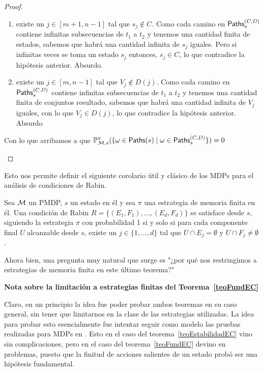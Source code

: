 \begin{proof}
\begin{itemize}
		      \begin{enumerate}
			      \item existe un $j \in [m+1, n-1]$ tal que $s_j \notin C$. Como cada camino en
			            $\textsf{Paths}_s^{(C,D)}$ contiene infinitas subsecuencias de $t_1$ a $t_2$ y tenemos
			            una cantidad finita de estados, sabemos que habrá una cantidad infinita de
			            $s_j$ iguales. Pero si infinitas veces se toma un estado $s_j$ entonces, $s_j
				            \in C$, lo que contradice la hipótesis anterior. Absurdo.

			      \item existe un $j \in [m, n-1]$ tal que $V_j \notin D(j)$. Como cada camino en
			            $\textsf{Paths}_s^{(C,D)}$ contiene infinitas subsecuencias de $t_1$ a $t_2$ y tenemos
			            una cantidad finita de conjuntos resultado, sabemos que habrá una cantidad
			            infinita de $V_j$ iguales, con lo que $V_j \in D(j)$, lo que contradice la
			            hipótesis anterior. Absurdo
		      \end{enumerate}
		      Con lo que arribamos a que $\mathbb{P}^\pi_{\mathcal{M}, s}(\{ \omega \in \textsf{Paths}(s) \mid \omega \in \textsf{Paths}_s^{(C,D)}\}) = 0  $
	\end{itemize}

\end{proof}

Esto nos permite definir el siguiente corolario útil y clásico de los MDPs para
el análisis de condiciones de Rabin.

\begin{corollary}
	Sea $\mathcal{M}$ un PMDP, $s$ un estado en él y sea $\pi$ una estrategia de memoria finita en él. Una condición de Rabin $R = \{ (E_1, F_1), \dots, (E_d, F_d)\}$ se satisface desde $s$, siguiendo la estrategia $\pi$ con probabilidad 1 si y solo si para cada componente final $U$ alcanzable desde $s$, existe un $j \in \{ 1, \dots, d\}$ tal que $U \cap E_j = \emptyset$ y $U \cap F_j \neq \emptyset$.
\end{corollary}

Ahora bien, una pregunta muy natural que surge es "¿por qué nos restringimos a
estrategias de memoria finita en este último teorema?"

\textbf{Nota sobre la limitación a estrategias finitas del Teorema~\ref{teoFundEC}}

Claro, en un principio la idea fue poder probar ambos teoremas en su caso
general, sin tener que limitarnos en la clase de las estrategias utilizadas. La
idea para probar esto esencialmente fue intentar seguir como modelo las pruebas
realizadas para MDPs en \cite{AlfaroThesis,BaierKatoen}. Esto en el caso del
teorema~\ref{teoEstabilidadEC} vino sin complicaciones, pero en el caso del
teorema~\ref{teoFundEC} devino en problemas, puesto que la finitud de acciones
salientes de un estado probó ser una hipótesis fundamental.

